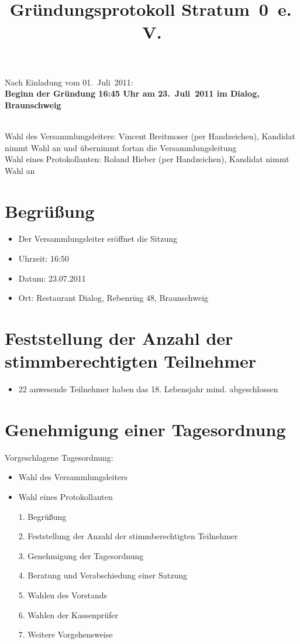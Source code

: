 \documentclass[a4paper,12pt]{scrartcl}
\title{Gr\"undungsprotokoll Stratum~0~e.\,V.}
\date{}
\begin{document}
\maketitle

\quad Nach Einladung vom 01.~Juli~2011:\\
\textbf{Beginn der Gr\"undung 16:45 Uhr am 23.~Juli~2011 im Dialog, Braunschweig}

\quad\\

Wahl des Versammlungsleiters: Vincent Breitmoser (per Handzeichen), Kandidat nimmt Wahl an und
übernimmt fortan die Versammlungsleitung \\

Wahl eines Protokollanten: Roland Hieber (per Handzeichen), Kandidat nimmt Wahl an

\section{Begr\"u\ss{}ung}
\begin{itemize}
    \item Der Versammlungsleiter eröffnet die Sitzung
    \item Uhrzeit: 16:50
    \item Datum: 23.07.2011
    \item Ort: Restaurant Dialog, Rebenring 48, Braunschweig
\end{itemize}

\section{Feststellung der Anzahl der stimmberechtigten Teilnehmer}
\begin{itemize}
    \item 22 anwesende Teilnehmer haben das 18. Lebensjahr mind. abgeschlossen
\end{itemize}

\pagebreak

\section{Genehmigung einer Tagesordnung}
Vorgeschlagene Tagesordnung:

\begin{itemize}
    \item Wahl des Versammlungsleiters
    \item Wahl eines Protokollanten
    \item[1.] Begrüßung
    \item[2.] Feststellung der Anzahl der stimmberechtigten Teilnehmer
    \item[3.] Genehmigung der Tagesordnung
    \item[4.] Beratung und Verabschiedung einer Satzung
    \item[5.] Wahlen des Vorstands
    \item[6.] Wahlen der Kassenprüfer
    \item[7.] Weitere Vorgehensweise
\end{itemize}
\end{document}
